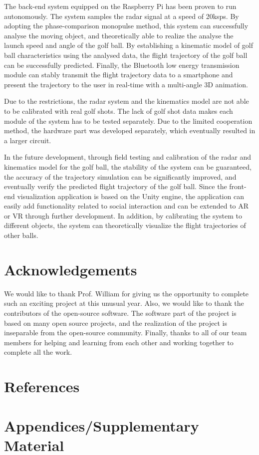 The back-end system equipped on the Raspberry Pi has been proven to run autonomously. The system samples the radar signal at a speed of 20ksps. By adopting the phase-comparison monopulse method, this system can successfully analyse the moving object, and theoretically able to realize the analyse the launch speed and angle of the golf ball.
By establishing a kinematic model of golf ball characteristics using the analysed data, the flight trajectory of the golf ball can be successfully predicted. Finally, the Bluetooth low energy transmission module can stably transmit the flight trajectory data to a smartphone and present the trajectory to the user in real-time with a multi-angle 3D animation.

Due to the restrictions, the radar system and the kinematics model are not able to be calibrated with real golf shots. The lack of golf shot data makes each module of the system has to be tested separately. Due to the limited cooperation method, the hardware part was developed separately, which eventually resulted in a larger circuit.

In the future development, through field testing and calibration of the radar and kinematics model for the golf ball, the stability of the system can be guaranteed, the accuracy of the trajectory simulation can be significantly improved, and eventually verify the predicted flight trajectory of the golf ball. Since the front-end visualization application is based on the Unity engine, the application can easily add functionality related to social interaction and can be extended to AR or VR through further development. In addition, by calibrating the system to different objects, the system can theoretically visualize the flight trajectories of other balls.

\section{Acknowledgements}
We would like to thank Prof. William for giving us the opportunity to complete such an exciting project at this unusual year. Also, we would like to thank the contributors of the open-source software. The software part of the project is based on many open source projects, and the realization of the project is inseparable from the open-source community. Finally, thanks to all of our team members for helping and learning from each other and working together to complete all the work.

\newpage
\section{References}
\printbibliography[heading=none]


\section{Appendices/Supplementary Material}


